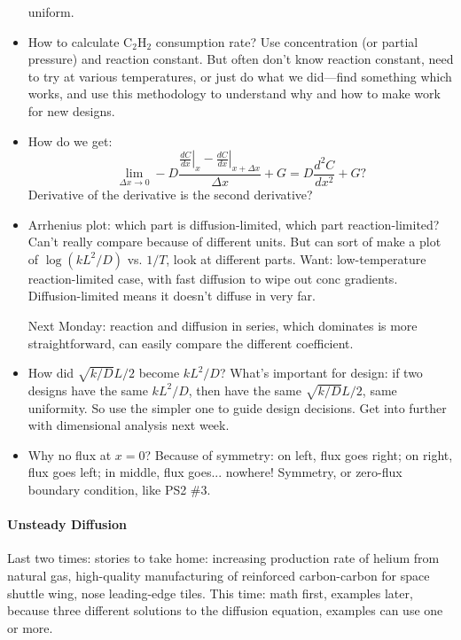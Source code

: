 \documentclass{report}
\begin{document}
\begin{itemize}
  uniform.
\item How to calculate C$_2$H$_2$ consumption rate?  Use concentration (or
  partial pressure) and reaction constant.  But often don't know reaction
  constant, need to try at various temperatures, or just do what we did---find
  something which works, and use this methodology to understand why and how to
  make work for new designs.
\item How do we get:
  \begin{equation}
    \label{eq:secondderivative}
    \lim_{\Delta x\rightarrow 0}-D\frac{\left.\frac{dC}{dx}\right|_x -
      \left.\frac{dC}{dx}\right|_{x+\Delta x}}{\Delta x} + G =
    D\frac{d^2C}{dx^2} + G?
  \end{equation}
  Derivative of the derivative is the second derivative?
\item Arrhenius plot: which part is diffusion-limited, which part
  reaction-limited?  Can't really compare because of different units.  But can
  sort of make a plot of $\log(kL^2/D)$ vs. $1/T$, look at different parts.
  Want: low-temperature reaction-limited case, with fast diffusion to wipe out
  conc gradients.  Diffusion-limited means it doesn't diffuse in very far.

  Next Monday: reaction and diffusion in series, which dominates is more
  straightforward, can easily compare the different coefficient.
\item How did $\sqrt{k/D}L/2$ become $kL^2/D$?  What's important for design: if
  two designs have the same $kL^2/D$, then have the same $\sqrt{k/D}L/2$, same
  uniformity.  So use the simpler one to guide design decisions.  Get into
  further with dimensional analysis next week.
\item Why no flux at $x=0$?  Because of symmetry: on left, flux goes right; on
  right, flux goes left; in middle, flux goes... nowhere!  Symmetry, or
  zero-flux boundary condition, like PS2 \#3.
\end{itemize}

\paragraph{Unsteady Diffusion}

Last two times: stories to take home: increasing production rate of helium from
natural gas, high-quality manufacturing of reinforced carbon-carbon for space
shuttle wing, nose leading-edge tiles.  This time: math first, examples later,
because three different solutions to the diffusion equation, examples can use
one or more.
\end{document}

